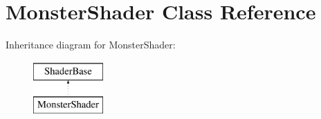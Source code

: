 \hypertarget{classMonsterShader}{\section{\-Monster\-Shader \-Class \-Reference}
\label{classMonsterShader}
}
\-Inheritance diagram for \-Monster\-Shader\-:\begin{figure}[H]
\begin{center}
\leavevmode
\includegraphics[height=2.000000cm]{classMonsterShader}
\end{center}
\end{figure}

